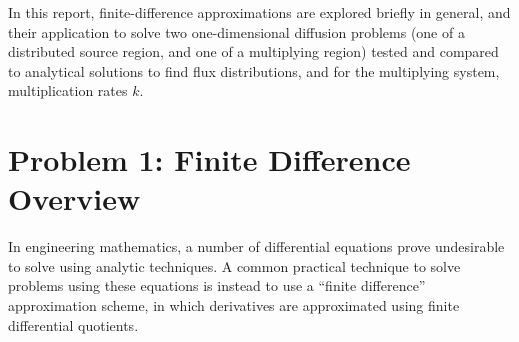 \documentclass[12pt]{article}
\begin{document}
In this report, finite-difference approximations are explored briefly in general, and their application to solve two one-dimensional diffusion problems (one of a distributed source region, and one of a multiplying region) tested and compared to analytical solutions to find flux distributions, and for the multiplying system, multiplication rates $k$.
\section{Problem 1: Finite Difference Overview}
In engineering mathematics, a number of differential equations prove undesirable to solve using analytic techniques.
A common practical technique to solve problems using these equations is instead to use a ``finite difference'' approximation scheme, in which derivatives are approximated using finite differential quotients.\\
\end{document}
